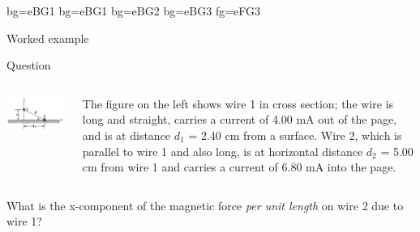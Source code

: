 {
 {bg=eBG1}
 {bg=eBG1}
 {bg=eBG2}
 {bg=eBG3}
 {fg=eFG3}

%
%
%

\begin{frame}{Worked example}

\begin{blockexmplque}{Question}

\begin{columns}
  \begin{column}{0.30\textwidth}
    \begin{center}
      \includegraphics[width=0.98\textwidth]{./images/problems/lect5_force_2wires.png}\\
    \end{center}
  \end{column}
  \begin{column}{0.70\textwidth}
    {\small
        The figure on the left shows wire 1 in cross section; the wire
        is long and straight, carries a current of 4.00 mA out of the
        page, and is at distance $d_1$ = 2.40 cm from a surface.
        Wire 2, which is parallel to wire 1 and also long,  is at
        horizontal distance $d_2$ = 5.00 cm from wire 1 and carries a
        current of 6.80 mA into the page.\\
    }
  \end{column}
\end{columns}
\vspace{0.2cm}
What is the x-component of
the magnetic force {\em per unit length} on wire 2 due to wire 1?
\end{blockexmplque}


\end{frame}}
